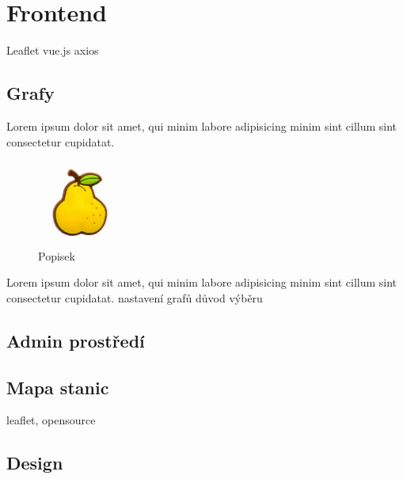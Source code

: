 \section{Frontend}
Leaflet
vue.js
axios

\subsection{Grafy}
Lorem ipsum dolor sit amet, qui minim labore adipisicing minim sint cillum sint consectetur cupidatat.
\begin{figure}[h]
    \centering
    \includegraphics[width=0.25\textwidth]{images/hruska.jpg}
    \caption{Popisek}
    \label{graf_label}
\end{figure}
Lorem ipsum dolor sit amet, qui minim labore adipisicing minim sint cillum sint consectetur cupidatat.
nastavení grafů
důvod výběru
\subsection{Admin prostředí}

\subsection{Mapa stanic}
leaflet, opensource
\subsection{Design}
